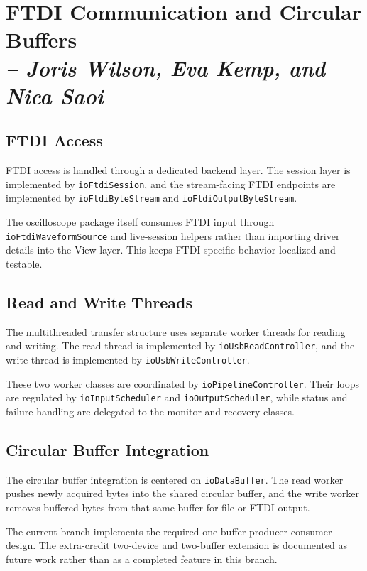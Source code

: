 \section{FTDI Communication and Circular Buffers \\
\small{\textit{-- Joris Wilson, Eva Kemp, and Nica Saoi}}}
\label{Section::FTDI Communication and Circular Buffers}

\subsection{FTDI Access}
FTDI access is handled through a dedicated backend layer. The session layer is implemented by \texttt{ioFtdiSession}, and the stream-facing FTDI endpoints are implemented by \texttt{ioFtdiByteStream} and \texttt{ioFtdiOutputByteStream}.

The oscilloscope package itself consumes FTDI input through \texttt{ioFtdiWaveformSource} and live-session helpers rather than importing driver details into the View layer. This keeps FTDI-specific behavior localized and testable.

\subsection{Read and Write Threads}
The multithreaded transfer structure uses separate worker threads for reading and writing. The read thread is implemented by \texttt{ioUsbReadController}, and the write thread is implemented by \texttt{ioUsbWriteController}.

These two worker classes are coordinated by \texttt{ioPipelineController}. Their loops are regulated by \texttt{ioInputScheduler} and \texttt{ioOutputScheduler}, while status and failure handling are delegated to the monitor and recovery classes.

\subsection{Circular Buffer Integration}
The circular buffer integration is centered on \texttt{ioDataBuffer}. The read worker pushes newly acquired bytes into the shared circular buffer, and the write worker removes buffered bytes from that same buffer for file or FTDI output.

The current branch implements the required one-buffer producer-consumer design. The extra-credit two-device and two-buffer extension is documented as future work rather than as a completed feature in this branch.

